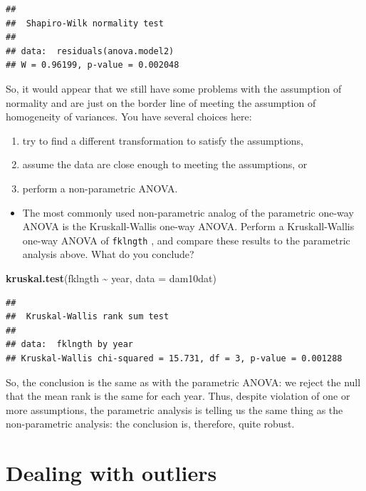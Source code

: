 \documentclass[
  12pt,
]{book}
\newenvironment{Shaded}{\begin{snugshade}}{\end{snugshade}}
\newcommand{\DataTypeTok}[1]{\textcolor[rgb]{0.13,0.29,0.53}{#1}}
\newcommand{\KeywordTok}[1]{\textcolor[rgb]{0.13,0.29,0.53}{\textbf{#1}}}
\newcommand{\NormalTok}[1]{#1}
\newcommand{\OperatorTok}[1]{\textcolor[rgb]{0.81,0.36,0.00}{\textbf{#1}}}
\newcommand{\StringTok}[1]{\textcolor[rgb]{0.31,0.60,0.02}{#1}}
\providecommand{\tightlist}{%
  \setlength{\itemsep}{0pt}\setlength{\parskip}{0pt}}
\begin{document}
\begin{verbatim}
## 
##  Shapiro-Wilk normality test
## 
## data:  residuals(anova.model2)
## W = 0.96199, p-value = 0.002048
\end{verbatim}

So, it would appear that we still have some problems with the assumption of normality and are just on the border line of meeting the assumption of homogeneity of variances. You have several choices here:

\begin{enumerate}
\def\labelenumi{\arabic{enumi}.}
\tightlist
\item
  try to find a different transformation to satisfy the assumptions,
\item
  assume the data are close enough to meeting the assumptions, or
\item
  perform a non-parametric ANOVA.
\end{enumerate}

\begin{itemize}
\tightlist
\item
  The most commonly used non-parametric analog of the parametric one-way ANOVA is the Kruskall-Wallis one-way ANOVA. Perform a Kruskall-Wallis one-way ANOVA of \texttt{fklngth} , and compare these results to the parametric analysis above. What do you conclude?
\end{itemize}

\begin{Shaded}
\begin{Highlighting}[]
\KeywordTok{kruskal.test}\NormalTok{(fklngth }\OperatorTok{\textasciitilde{}}\StringTok{ }\NormalTok{year, }\DataTypeTok{data =}\NormalTok{ dam10dat)}
\end{Highlighting}
\end{Shaded}

\begin{verbatim}
## 
##  Kruskal-Wallis rank sum test
## 
## data:  fklngth by year
## Kruskal-Wallis chi-squared = 15.731, df = 3, p-value = 0.001288
\end{verbatim}

So, the conclusion is the same as with the parametric ANOVA: we reject the null that the mean rank is the same for each year. Thus, despite violation of one or more assumptions, the parametric analysis is telling us the same thing as the non-parametric analysis: the conclusion is, therefore, quite robust.

\hypertarget{dealing-with-outliers-1}{%
\section{Dealing with outliers}\label{dealing-with-outliers-1}}
\end{document}
